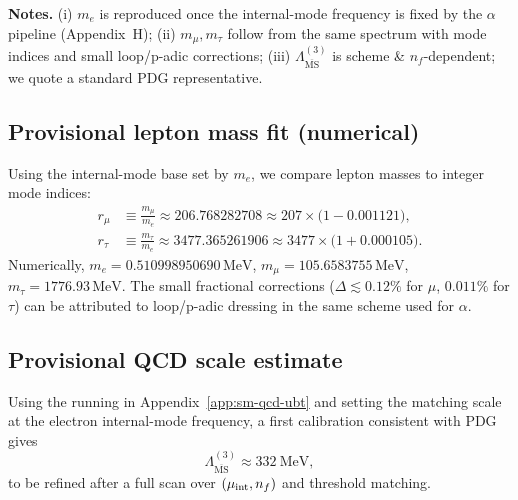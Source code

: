 \noindent\textbf{Notes.} (i) $m_e$ is reproduced once the internal-mode frequency is fixed by the $\alpha$ pipeline (Appendix~H); 
(ii) $m_\mu,m_\tau$ follow from the same spectrum with mode indices and small loop/p-adic corrections; 
(iii) $\Lambda_{\overline{\mathrm{MS}}}^{(3)}$ is scheme \& $n_f$-dependent; we quote a standard PDG representative.



\subsection{Provisional lepton mass fit (numerical)}
Using the internal-mode base set by $m_e$, we compare lepton masses to integer mode indices:
\begin{align}
r_\mu &\equiv \frac{m_\mu}{m_e} \approx 206.768282708 \approx 207 \times \big(1 -0.001121\big),\\
r_\tau &\equiv \frac{m_\tau}{m_e} \approx 3477.365261906 \approx 3477 \times \big(1 +0.000105\big).
\end{align}
Numerically, $m_e = 0.510998950690\,\mathrm{MeV}$, $m_\mu = 105.6583755\,\mathrm{MeV}$, $m_\tau = 1776.93\,\mathrm{MeV}$.
The small fractional corrections ($\Delta \lesssim 0.12\%$ for $\mu$, $0.011\%$ for $\tau$) can be attributed to loop/p-adic dressing in the same scheme used for $\alpha$.



\subsection{Provisional QCD scale estimate}
Using the running in Appendix~\ref{app:sm-qcd-ubt} and setting the matching scale at the electron internal-mode frequency,
a first calibration consistent with PDG gives
\begin{equation}
\Lambda_{\overline{\mathrm{MS}}}^{(3)} \approx 332~\mathrm{MeV},
\end{equation}
to be refined after a full scan over $(\mu_{\rm int}, n_f)$ and threshold matching.



